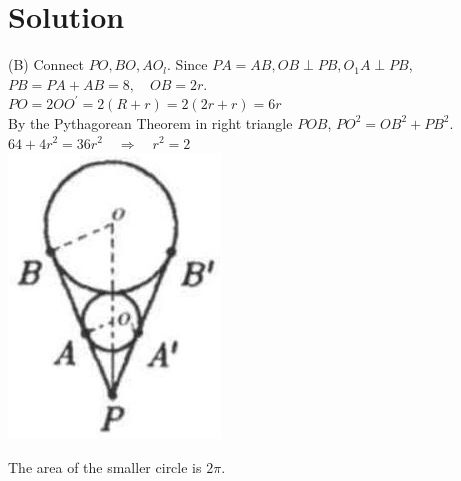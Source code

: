 \documentclass{article}
\begin{document}
\section*{Solution}
(B)
Connect \(P O, B O, A O_{l}\). Since \(P A=A B, O B \perp P B, O_{1} A \perp P B\), \(P B=P A+A B=8, \quad O B=2 r\).\\
\(P O=2 O O^{\prime}=2(R+r)=2(2 r+r)=6 r\)\\
By the Pythagorean Theorem in right triangle \(P O B\), \(P O^{2}=O B^{2}+P B^{2}\).\\
\(64+4 r^{2}=36 r^{2} \quad \Rightarrow \quad r^{2}=2\)\\
\centering
\includegraphics[width=\textwidth]{images/reasoning_image_1.jpg}

The area of the smaller circle is \(2 \pi\).
\end{document}

